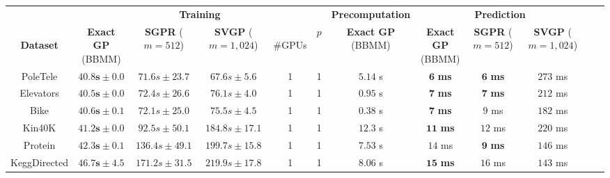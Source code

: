 \begin{tabular}{ cccccccccccccc }
  \toprule
  &
 \multicolumn{5}{c}{{\bf Training}} &
  \multicolumn{3}{r}{\small\bf Precomputation} &
  \multicolumn{3}{c}{{\bf Prediction}} \\
  \cline{2-6} \cline{8-8} \cline{10-12}
  \thead{\\{\bf Dataset}} &
  \thead{{\bf Exact GP} \\ (BBMM)} &
  \thead{{\bf SGPR} \\ ($m\!=\!512$)} &
  \thead{{\bf SVGP} \\ ($m\!=\!1,\!024$)} &
  \thead{\\\#GPUs} & \thead{\\$p$} &&
  \thead{{\bf Exact GP} \\ (BBMM)} &&
  \thead{{\bf Exact GP} \\ (BBMM)} &
  \thead{{\bf SGPR} \\ ($m\!=\!512$)} &
  \thead{{\bf SVGP} \\ ($m\!=\!1,\!024$)}
  \\
  \midrule
	PoleTele             &       $\mathbf{40.8s}\pm 0.0$ &      $71.6s\pm 23.7$            &       $67.6s\pm 5.6$  & 1 & 1     & & $5.14$ s    && $\mathbf{6}$ \textbf{ms}    & $\mathbf{6}$ \bf ms    & $273$ ms \\
	Elevators            &       $\mathbf{40.5s}\pm 0.0$ &      $72.4s\pm 26.6$            &       $76.1s\pm 4.0$  & 1 & 1     & & $0.95$ s    && $\mathbf{7}$ \textbf{ms}    & $\mathbf{7}$ \bf ms    & $212$ ms \\
	Bike                 &       $\mathbf{40.6s}\pm 0.1$ &      $72.1s\pm 25.0$            &       $75.5s\pm 4.5$  & 1 & 1     & & $0.38$ s    && $\mathbf{7}$ \textbf{ms}    & ${9}$ ms               & $182$ ms \\
	Kin40K               &       $\mathbf{41.2s}\pm 0.0$ &      $92.5s\pm 50.1$            &     $184.8s\pm 17.1$  & 1 & 1     & & $12.3$ s     && $\mathbf{11}$ \textbf{ms}   & $       {12}$ ms       & $220$ ms \\
	Protein              &       $\mathbf{42.3s}\pm 0.1$ &     $136.4s\pm 49.1$            &     $199.7s\pm 15.8$  & 1 & 1     & & $7.53$ s     && $       {14}$ ms            & $\mathbf{9}$ \bf ms    & $146$ ms \\
	KeggDirected         &       $\mathbf{46.7s}\pm 4.5$ &     $171.2s\pm 31.5$            &     $219.9s\pm 17.8$  & 1 & 1     & & $8.06$ s    && $\mathbf{15}$ \textbf{ms}   & $       {16}$ ms       & $143$ ms \\

\end{tabular}
